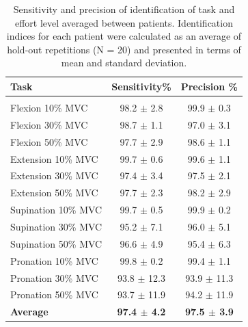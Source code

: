 \begin{table}[h!]
\centering
\caption{Sensitivity and precision of identification of task and effort level averaged between patients. Identification indices for each patient were calculated as an average of hold-out repetitions (N = 20) and presented in terms of mean and standard deviation.}
\small
\vspace{3mm}
\label{tb:3-2}
\begin{threeparttable}
\begin{tabular}{lcc}
Task       & Sensitivity\%           & Precision \% \\ \hline
              &                &                                              \\
Flexion 10\% MVC             & 98.2 $\pm$ 2.8             & 99.9 $\pm$ 0.3                      \\
Flexion 30\% MVC             & 98.7 $\pm$ 1.1            & 97.0 $\pm$ 3.1                      \\
Flexion 50\% MVC             & 97.7 $\pm$ 2.9             & 98.6 $\pm$ 1.1                         \\
Extension 10\% MVC             & 99.7 $\pm$ 0.6            & 99.6 $\pm$ 1.1             \\
Extension 30\% MVC             & 97.4 $\pm$ 3.4             & 97.5 $\pm$ 2.1                      \\
Extension 50\% MVC             & 97.7 $\pm$ 2.3             & 98.2 $\pm$ 2.9                      \\
Supination 10\% MVC             & 99.7 $\pm$ 0.5             & 99.9 $\pm$ 0.2                          \\
Supination 30\% MVC             & 95.2 $\pm$ 7.1            & 96.0 $\pm$ 5.1             \\
Supination 50\% MVC             & 96.6 $\pm$ 4.9             & 95.4 $\pm$ 6.3                      \\
Pronation 10\% MVC             & 99.8 $\pm$ 0.2             & 99.4 $\pm$ 1.1                      \\
Pronation 30\% MVC             & 93.8 $\pm$ 12.3             & 93.9 $\pm$ 11.3                          \\
Pronation 50\% MVC             & 93.7 $\pm$ 11.9            & 94.2 $\pm$ 11.9             \\
\textbf{Average}             & \textbf{97.4 $\pm$ 4.2}             & \textbf{97.5 $\pm$ 3.9}           
\end{tabular}
    \end{threeparttable}
\end{table}


